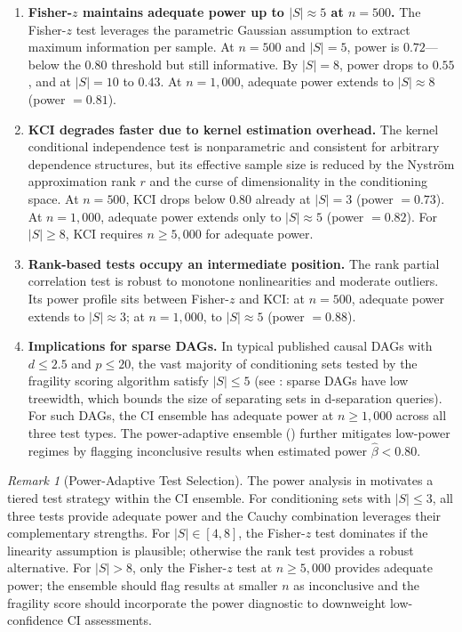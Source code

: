 \documentclass[11pt,a4paper]{article}
\theoremstyle{definition}
\theoremstyle{remark}
\newtheorem{remark}[theorem]{Remark}
\begin{document}
\begin{enumerate}[label=(\roman*)]
  \item \textbf{Fisher-$z$ maintains adequate power up to $|S| \approx 5$
    at $n = 500$.} The Fisher-$z$ test leverages the parametric Gaussian
    assumption to extract maximum information per sample. At $n = 500$
    and $|S| = 5$, power is $0.72$---below the $0.80$ threshold but
    still informative. By $|S| = 8$, power drops to $0.55$, and at
    $|S| = 10$ to $0.43$. At $n = 1{,}000$, adequate power extends to
    $|S| \approx 8$ (power $= 0.81$).

  \item \textbf{KCI degrades faster due to kernel estimation overhead.}
    The kernel conditional independence test \cite{shah2020} is
    nonparametric and consistent for arbitrary dependence structures, but
    its effective sample size is reduced by the Nystr\"om approximation
    rank $r$ and the curse of dimensionality in the conditioning space.
    At $n = 500$, KCI drops below $0.80$ already at $|S| = 3$ (power
    $= 0.73$). At $n = 1{,}000$, adequate power extends only to
    $|S| \approx 5$ (power $= 0.82$). For $|S| \geq 8$, KCI requires
    $n \geq 5{,}000$ for adequate power.

  \item \textbf{Rank-based tests occupy an intermediate position.} The
    rank partial correlation test is robust to monotone nonlinearities
    and moderate outliers. Its power profile sits between Fisher-$z$ and
    KCI: at $n = 500$, adequate power extends to $|S| \approx 3$; at
    $n = 1{,}000$, to $|S| \approx 5$ (power $= 0.88$).

  \item \textbf{Implications for sparse DAGs.} In typical published
    causal DAGs with $d \leq 2.5$ and $p \leq 20$, the vast majority of
    conditioning sets tested by the fragility scoring algorithm satisfy
    $|S| \leq 5$ (see : sparse DAGs have low
    treewidth, which bounds the size of separating sets in d-separation
    queries). For such DAGs, the CI ensemble has adequate power at
    $n \geq 1{,}000$ across all three test types. The power-adaptive
    ensemble () further mitigates low-power
    regimes by flagging inconclusive results when estimated power
    $\hat\beta < 0.80$.
\end{enumerate}

\begin{remark}[Power-Adaptive Test Selection]
\label{rem:power_adaptive}
The power analysis in  motivates a tiered test
strategy within the CI ensemble. For conditioning sets with $|S| \leq 3$,
all three tests provide adequate power and the Cauchy combination
leverages their complementary strengths. For $|S| \in [4, 8]$, the
Fisher-$z$ test dominates if the linearity assumption is plausible;
otherwise the rank test provides a robust alternative. For $|S| > 8$,
only the Fisher-$z$ test at $n \geq 5{,}000$ provides adequate power;
the ensemble should flag results at smaller $n$ as inconclusive and
the fragility score should incorporate the power diagnostic to
downweight low-confidence CI assessments.
\end{remark}
\end{document}
